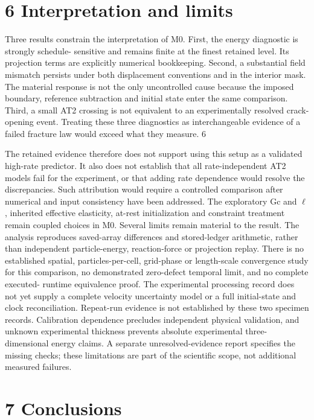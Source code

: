 \documentclass[11pt]{article}
\begin{document}
\section*{6 Interpretation and limits}

Three results constrain the interpretation of M0. First, the energy diagnostic is strongly schedule-
sensitive and remains finite at the finest retained level. Its projection terms are explicitly numerical
bookkeeping. Second, a substantial field mismatch persists under both displacement conventions
and in the interior mask. The material response is not the only uncontrolled cause because the
imposed boundary, reference subtraction and initial state enter the same comparison. Third, a
small AT2 crossing is not equivalent to an experimentally resolved crack-opening event. Treating
these three diagnostics as interchangeable evidence of a failed fracture law would exceed what they
measure.
6

The retained evidence therefore does not support using this setup as a validated high-rate
predictor. It also does not establish that all rate-independent AT2 models fail for the experiment,
or that adding rate dependence would resolve the discrepancies. Such attribution would require a
controlled comparison after numerical and input consistency have been addressed. The exploratory
Gc and \ensuremath{\ell}, inherited effective elasticity, at-rest initialization and constraint treatment remain coupled
choices in M0.
Several limits remain material to the result. The analysis reproduces saved-array differences
and stored-ledger arithmetic, rather than independent particle-energy, reaction-force or projection
replay. There is no established spatial, particles-per-cell, grid-phase or length-scale convergence
study for this comparison, no demonstrated zero-defect temporal limit, and no complete executed-
runtime equivalence proof. The experimental processing record does not yet supply a complete
velocity uncertainty model or a full initial-state and clock reconciliation. Repeat-run evidence is
not established by these two specimen records. Calibration dependence precludes independent
physical validation, and unknown experimental thickness prevents absolute experimental three-
dimensional energy claims. A separate unresolved-evidence report specifies the missing checks;
these limitations are part of the scientific scope, not additional measured failures.

\section*{7 Conclusions}
\end{document}
